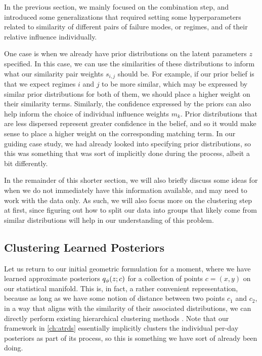 In the previous section, we mainly focused on the combination step, and introduced some generalizations that required setting some hyperparameters related to similarity of different pairs of failure modes, or regimes, and of their relative influence individually. 

One case is when we already have prior distributions on the latent parameters $z$ specified. In this case, we can use the similarities of these distributions to inform what our similarity pair weights $s_{i,j}$ should be. For example, if our prior belief is that we expect regimes $i$ and $j$ to be more similar, which may be expressed by similar prior distributions for both of them, we should place a higher weight on their similarity terms. Similarly, the confidence expressed by the priors can also help inform the choice of individual influence weights $m_k$. Prior distributions that are less dispersed represent greater confidence in the belief, and so it would make sense to place a higher weight on the corresponding matching term. In our guiding case study, we had already looked into specifying prior distributions, so this was something that was sort of implicitly done during the process, albeit a bit differently.

In the remainder of this shorter section, we will also briefly discuss some ideas for when we do not immediately have this information available, and may need to work with the data only. As such, we will also focus more on the clustering step at first, since figuring out how to split our data into groups that likely come from similar distributions will help in our understanding of this problem.

\subsection{Clustering Learned Posteriors}

Let us return to our initial geometric formulation for a moment, where we have learned approximate posteriors $\qvd{z;c}$ for a collection of points $c=(x,y)$ on our statistical manifold. This is, in fact, a rather convenient representation, because as long as we have some notion of distance between two points $c_1$ and $c_2$, in a way that aligns with the similarity of their associated distributions, we can directly perform existing hierarchical clustering methods \cite{Ran_Xi_Lu_Wang_Lu_2023}. Note that our framework in \cref{ch:atrds} essentially implicitly clusters the individual per-day posteriors as part of its process, so this is something we have sort of already been doing. 

